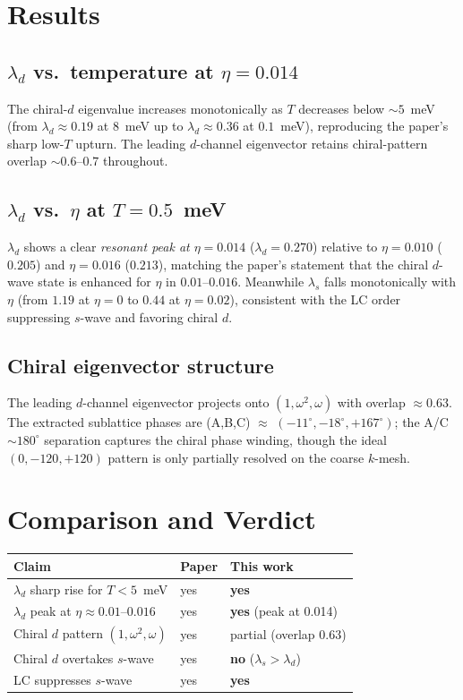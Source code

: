 \documentclass[11pt]{article}
\begin{document}
\section{Results}
\subsection{$\lambda_d$ vs.\ temperature at $\eta=0.014$}
The chiral-$d$ eigenvalue increases monotonically as $T$ decreases below
$\sim 5$~meV (from $\lambda_d\approx0.19$ at $8$~meV up to $\lambda_d\approx0.36$
at $0.1$~meV), reproducing the paper's sharp low-$T$ upturn. The leading
$d$-channel eigenvector retains chiral-pattern overlap $\sim0.6$--$0.7$ throughout.

\subsection{$\lambda_d$ vs.\ $\eta$ at $T=0.5$~meV}
$\lambda_d$ shows a clear \emph{resonant peak at $\eta=0.014$}
($\lambda_d=0.270$) relative to $\eta=0.010$ ($0.205$) and $\eta=0.016$ ($0.213$),
matching the paper's statement that the chiral $d$-wave state is enhanced for
$\eta$ in $0.01$--$0.016$. Meanwhile $\lambda_s$ falls monotonically with $\eta$
(from $1.19$ at $\eta=0$ to $0.44$ at $\eta=0.02$), consistent with the LC order
suppressing $s$-wave and favoring chiral $d$.

\subsection{Chiral eigenvector structure}
The leading $d$-channel eigenvector projects onto $(1,\omega^2,\omega)$ with
overlap $\approx0.63$. The extracted sublattice phases are (A,B,C) $\approx$
$(-11^\circ, -18^\circ, +167^\circ)$; the A/C $\sim180^\circ$ separation captures
the chiral phase winding, though the ideal $(0,-120,+120)$ pattern is only
partially resolved on the coarse $k$-mesh.

\section{Comparison and Verdict}
\begin{tabular}{lll}
\toprule
Claim & Paper & This work \\
\midrule
$\lambda_d$ sharp rise for $T<5$~meV & yes & \textbf{yes} \\
$\lambda_d$ peak at $\eta\!\approx\!0.01$--$0.016$ & yes & \textbf{yes} (peak at 0.014) \\
Chiral $d$ pattern $(1,\omega^2,\omega)$ & yes & partial (overlap 0.63) \\
Chiral $d$ overtakes $s$-wave & yes & \textbf{no} ($\lambda_s>\lambda_d$) \\
LC suppresses $s$-wave & yes & \textbf{yes} \\
\bottomrule
\end{tabular}
\end{document}
